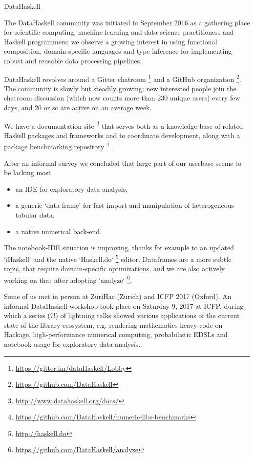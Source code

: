 \documentclass[DIV16,twocolumn,10pt]{scrreprt}
\begin{document}
\begin{hcarentry}{DataHaskell}
\makeheader

The DataHaskell community was initiated in September 2016 as a gathering place for scientific computing, machine learning and data science practitioners and Haskell programmers; we observe a growing interest in using functional composition, domain-specific languages and type inference for implementing robust and reusable data processing pipelines.

DataHaskell revolves around a Gitter chatroom \footnote{\url{https://gitter.im/dataHaskell/Lobby}} and a GitHub organization \footnote{\url{https://github.com/DataHaskell}}. The community is slowly but steadily growing; new interested people join the chatroom discussion (which now counts more than 230 unique users) every few days, and 20 or so are active on an average week.

We have a documentation site \footnote{\url{http://www.datahaskell.org/docs/}} that serves both as a knowledge base of related Haskell packages and frameworks and to coordinate development, along with a package benchmarking repository \footnote{\url{https://github.com/DataHaskell/numeric-libs-benchmarks}}.

After an informal survey we concluded that large part of our userbase seems to be lacking most
\begin{itemize} 
\item an IDE for exploratory data analysis,
\item a generic `data-frame' for fast import and manipulation of heterogeneous tabular data,
\item a native numerical back-end.
\end{itemize}

The notebook-IDE situation is improving, thanks for example to an updated `iHaskell` and the native `Haskell.do` \footnote{\url{http://haskell.do}} editor. Dataframes are a more subtle topic, that require domain-specific optimizations, and we are also actively working on that after adopting `analyze` \footnote{\url{https://github.com/DataHaskell/analyze}}.

Some of us met in person at ZuriHac (Zurich) and ICFP 2017 (Oxford). An informal DataHaskell workshop took place on Saturday 9, 2017 at ICFP, during which a series (7!) of lightning talks showed various applications of the current state of the library ecosystem, e.g. rendering mathematics-heavy code on Hackage, high-performance numerical computing, probabilistic EDSLs and notebook usage for exploratory data analysis. 


\end{hcarentry}
\end{document}
